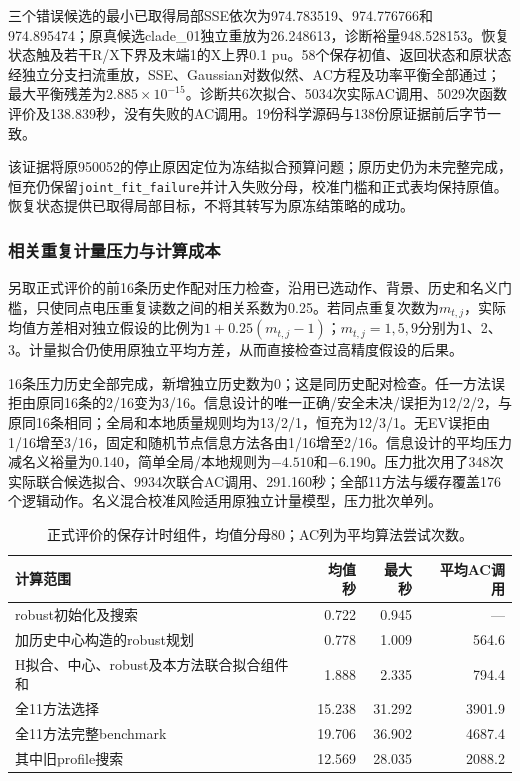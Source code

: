 \documentclass[UTF8,fontset=fandol,11pt,a4paper]{ctexart}
\begin{document}
三个错误候选的最小已取得局部SSE依次为974.783519、974.776766和974.895474；原真候选clade\_01独立重放为26.248613，诊断裕量948.528153。恢复状态触及若干R/X下界及末端1的X上界0.1 pu。58个保存初值、返回状态和原状态经独立分支扫流重放，SSE、Gaussian对数似然、AC方程及功率平衡全部通过；最大平衡残差为$2.885\times10^{-15}$。诊断共6次拟合、5034次实际AC调用、5029次函数评价及138.839秒，没有失败的AC调用。19份科学源码与138份原证据前后字节一致。

该证据将原950052的停止原因定位为冻结拟合预算问题；原历史仍为未完整完成，恒充仍保留\texttt{joint\_fit\_failure}并计入失败分母，校准门槛和正式表均保持原值。恢复状态提供已取得局部目标，不将其转写为原冻结策略的成功。

\subsubsection{相关重复计量压力与计算成本}
另取正式评价的前16条历史作配对压力检查，沿用已选动作、背景、历史和名义门槛，只使同点电压重复读数之间的相关系数为0.25。若同点重复次数为$m_{t,j}$，实际均值方差相对独立假设的比例为$1+0.25(m_{t,j}-1)$；$m_{t,j}=1,5,9$分别为1、2、3。计量拟合仍使用原独立平均方差，从而直接检查过高精度假设的后果。

16条压力历史全部完成，新增独立历史数为0；这是同历史配对检查。任一方法误拒由原同16条的2/16变为3/16。信息设计的唯一正确/安全未决/误拒为12/2/2，与原同16条相同；全局和本地质量规则均为13/2/1，恒充为12/3/1。无EV误拒由1/16增至3/16，固定和随机节点信息方法各由1/16增至2/16。信息设计的平均压力减名义裕量为0.140，简单全局/本地规则为$-4.510$和$-6.190$。压力批次用了348次实际联合候选拟合、9934次联合AC调用、291.160秒；全部11方法与缓存覆盖176个逻辑动作。名义混合校准风险适用原独立计量模型，压力批次单列。

{\small
\begin{longtable}{L{.48\textwidth}rrr}
\caption{正式评价的保存计时组件，均值分母80；AC列为平均算法尝试次数。}\label{tab:information-cost-v3}\\
\toprule
计算范围 & 均值秒 & 最大秒 & 平均AC调用\\
\midrule\endhead
robust初始化及搜索 &0.722&0.945&---\\
加历史中心构造的robust规划 &0.778&1.009&564.6\\
H拟合、中心、robust及本方法联合拟合组件和 &1.888&2.335&794.4\\
全11方法选择 &15.238&31.292&3901.9\\
全11方法完整benchmark &19.706&36.902&4687.4\\
其中旧profile搜索 &12.569&28.035&2088.2\\
\bottomrule
\end{longtable}}
\end{document}
